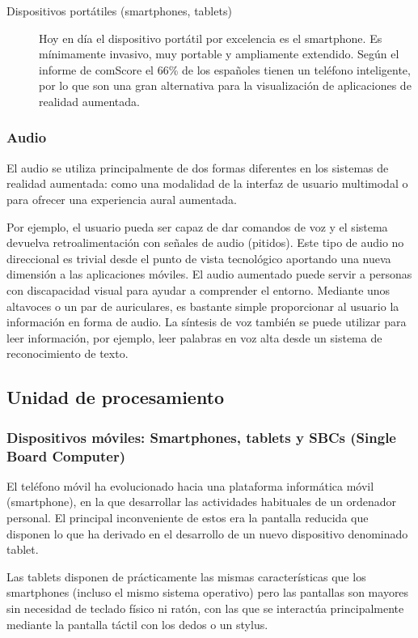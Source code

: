 \begin{description}
\item[Dispositivos portátiles (smartphones, tablets)]
  Hoy en día el dispositivo portátil por excelencia es el smartphone. Es mínimamente invasivo, muy portable y ampliamente extendido. Según el informe de comScore \cite{comScore} el 66\% de los españoles tienen un teléfono inteligente, por lo que son una gran alternativa para la visualización de aplicaciones de realidad aumentada.
\end{description}

\subsubsection{Audio}
El audio se utiliza principalmente de dos formas diferentes en los sistemas de realidad aumentada: como una modalidad de la interfaz de usuario multimodal o para ofrecer una experiencia aural aumentada. 

Por ejemplo, el usuario pueda ser capaz de dar comandos de voz y el sistema devuelva retroalimentación con señales de audio (pitidos). Este tipo de audio no direccional es trivial desde el punto de vista tecnológico aportando una nueva dimensión a las aplicaciones móviles. El audio aumentado puede servir a personas con discapacidad visual para ayudar a comprender el entorno. Mediante unos altavoces o un par de auriculares, es bastante simple proporcionar al usuario la información en forma de audio. La síntesis de voz también se puede utilizar para leer información, por ejemplo, leer palabras en voz alta desde un sistema de reconocimiento de texto.

\subsection{Unidad de procesamiento}
\subsubsection{Dispositivos móviles: Smartphones,  tablets y SBCs (Single Board Computer)}

El teléfono móvil ha evolucionado hacia una plataforma informática móvil (smartphone), en la que desarrollar las actividades habituales de un ordenador personal. El principal inconveniente de estos era la pantalla reducida que disponen lo que ha derivado en el desarrollo de un nuevo dispositivo denominado tablet. 

Las tablets disponen de prácticamente las mismas características que los smartphones (incluso el mismo sistema operativo) pero las pantallas son mayores sin necesidad de teclado físico ni ratón, con las que se interactúa principalmente mediante la pantalla táctil con los dedos o un stylus.

